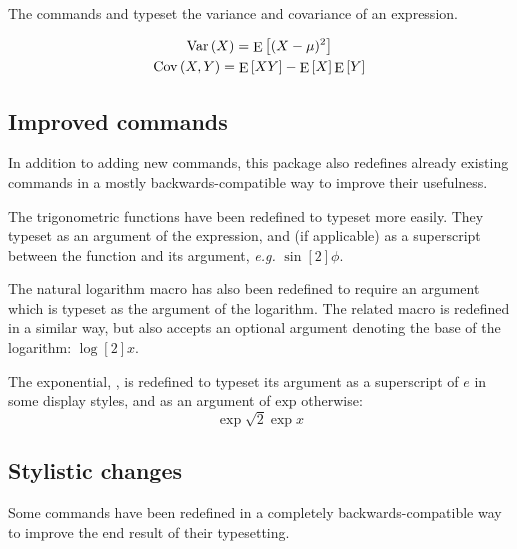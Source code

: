 \documentclass[commonsets,load]{skdoc}
\begin{document}
  \DescribeMacro{}
  \DescribeMacro{}
  The commands \Macro\var and \Macro\cov typeset the variance and
  covariance of an expression.
  \begin{example}
    \begin{gather*}
      \mathop{\mathrm{Var}}\left(X\right) = \mathop{\mathrm{E}}\left[(X-\mu)^2\right]\\
      \mathop{\mathrm{Cov}}\left(X,Y\right) = \mathop{\mathrm{E}}\left[XY\right]-\mathop{\mathrm{E}}\left[X\right]\mathop{\mathrm{E}}\left[Y\right]
    \end{gather*}
  \end{example}
 
  \subsection{Improved commands}
  In addition to adding new commands, this package also redefines
  already existing commands in a mostly backwards-compatible way
  to improve their usefulness.
 
  \DescribeMacro{} 
  \DescribeMacro{} 
  \DescribeMacro{} 
  \DescribeMacro{} 
  \DescribeMacro{} 
  \DescribeMacro{} 
  \DescribeMacro{} 
  The trigonometric functions have been redefined
  to typeset more easily. They typeset  as an
  argument of the expression, and (if applicable)  as
  a superscript between the function and its argument,
  \emph{e.g.} \(\sin[2]{\phi}\).
 
  \DescribeMacro{}
  The natural logarithm macro \Macro\ln has also been redefined to 
  require an argument which is typeset as the argument of the logarithm.
  \DescribeMacro{}
  The related macro \Macro\log is redefined in a similar way, but also 
  accepts an optional argument denoting the base of the logarithm:
  \(\log[2]{x}\).
 
  \DescribeMacro{}
  The exponential, \Macro\exp, is redefined to typeset its argument as a
  superscript of \(e\) in some display styles, and as an argument of
  \(\mathrm{exp}\) otherwise:
  \begin{equation*}
    \exp{\sqrt{2}\exp{x}}
  \end{equation*}

  \subsection{Stylistic changes}
  Some commands have been redefined in a completely backwards-compatible
  way to improve the end result of their typesetting.
 
\end{document}
